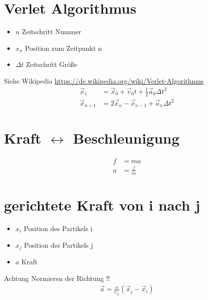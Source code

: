 \documentclass{article}
\begin{document}
\section*{Verlet Algorithmus}
\begin{itemize}
	\item $n$ Zeitschritt Nummer
	\item $x_{n}$ Position zum Zeitpunkt n
	\item $\Delta t$ Zeitschritt Größe
\end{itemize}
Siehe Wikipedia \url{https://de.wikipedia.org/wiki/Verlet-Algorithmus}\\
\begin{align*}
	\vec{x}_1&=\vec{x}_0+\vec{v}_0t+\frac{1}{2}\vec{a}_0\Delta t^2\\
	\vec{x}_{n+1}&=2\vec{x}_n-\vec{x}_{n-1}+\vec{a}_n\Delta t^2
\end{align*}

\section*{Kraft $\leftrightarrow$ Beschleunigung}
\begin{align*}
	f&=ma\\
	a&=\frac{f}{m}
\end{align*}

\section*{gerichtete Kraft von i nach j}
\begin{itemize}
	\item $x_{i}$ Position des Partikels i
	\item $x_{j}$ Position des Partikels j
	\item $a$ Kraft
\end{itemize}
Achtung Normieren der Richtung !!\\
\begin{align*}
	\vec{a}=\frac{a}{r_{ij}}\left(\vec{x}_{j}-\vec{x}_{i}\right)
\end{align*}
\newpage
\end{document}
